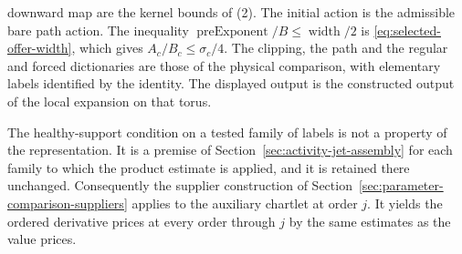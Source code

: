 \begin{lemma}
\begin{enumerate}
  downward map are the kernel bounds of (2). The initial action is the
  admissible bare path action. The inequality
  $\operatorname{preExponent}/B\le\operatorname{width}/2$ is
  \eqref{eq:selected-offer-width}, which gives
  $A_c/B_c\le\sigma_c/4$. The clipping, the path and the regular and
  forced dictionaries are those of the physical comparison, with
  elementary labels identified by the identity. The displayed output is
  the constructed output of the local expansion on that torus.
\end{enumerate}
The healthy-support condition on a tested family of labels is not a
property of the representation. It is a premise of
Section~\ref{sec:activity-jet-assembly} for each family to which the
product estimate is applied, and it is retained there unchanged.
Consequently the supplier construction of
Section~\ref{sec:parameter-comparison-suppliers} applies to the
auxiliary chartlet at order $j$. It yields the ordered derivative
prices at every order through $j$ by the same estimates as the value
prices.
\end{lemma}

